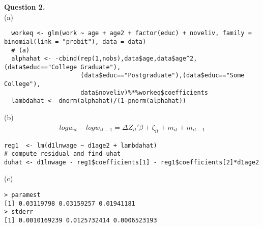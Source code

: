 \documentclass[paper=a4, fontsize=13pt]{extarticle} %
\numberwithin{equation}{section} %
\numberwithin{figure}{section} %
\numberwithin{table}{section} %
\begin{document}
\vspace{0.2in}
\textbf{Question 2.} \\
(a) \\
\begin{lstlisting}
  workeq <- glm(work ~ age + age2 + factor(educ) + noveliv, family = binomial(link = "probit"), data = data)
  # (a)
  alphahat <- -cbind(rep(1,nobs),data$age,data$age^2,(data$educ=="College Graduate"),
                     (data$educ=="Postgraduate"),(data$educ=="Some College"),
                     data$noveliv)%*%workeq$coefficients
  lambdahat <- dnorm(alphahat)/(1-pnorm(alphahat))
\end{lstlisting}
(b) 
\begin{gather}
log w_{it} - log w_{it-1} = \Delta Z_{it}' \beta + \zeta_{it} + m_{it} + m_{it-1}
\end{gather}
\begin{lstlisting}
reg1  <- lm(d1lnwage ~ d1age2 + lambdahat)
# compute residual and find uhat
duhat <- d1lnwage - reg1$coefficients[1] - reg1$coefficients[2]*d1age2
\end{lstlisting}
(c)
\begin{lstlisting}
> paramest
[1] 0.03119798 0.03159257 0.01941181
> stderr
[1] 0.0010169239 0.0125732414 0.0006523193
\end{lstlisting}
\end{document}
